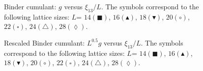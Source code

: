 \documentclass[12pt]{article}
\begin{document}
\begin{figure}
\vspace*{-1.5truecm} 
\begin{center}
\end{center}
\vspace*{0.truecm} 
\caption{Binder cumulant: $g$ versus $\xi_{13}/L$. 
The symbols correspond
to the following lattice sizes: $L$=
$14(\blacksquare)$, $16 (\blacktriangle)$, $18 (\blacktriangledown)$,
$20 (\circ  )$, $22 (\square) $, $24 (\triangle)$, $28 (\lozenge)$. 
}
\label{Binder-FFSplot-I}
\end{figure}
 
\begin{figure}
\vspace*{-1.5truecm}
\begin{center}
\end{center}
\vspace*{0.truecm} 
\caption{Rescaled Binder cumulant: $L^{0.5} g$ versus $\xi_{13}/L$. 
The symbols correspond 
to the following lattice sizes: $L$=
$14(\blacksquare)$, $16 (\blacktriangle)$, $18 (\blacktriangledown)$,
$20 (\circ  )$, $22 (\square) $, $24 (\triangle)$, $28 (\lozenge)$.  
}
\label{Binder-FFSplot-II}
\end{figure}                                                                    
                                                                                
\end{document}
